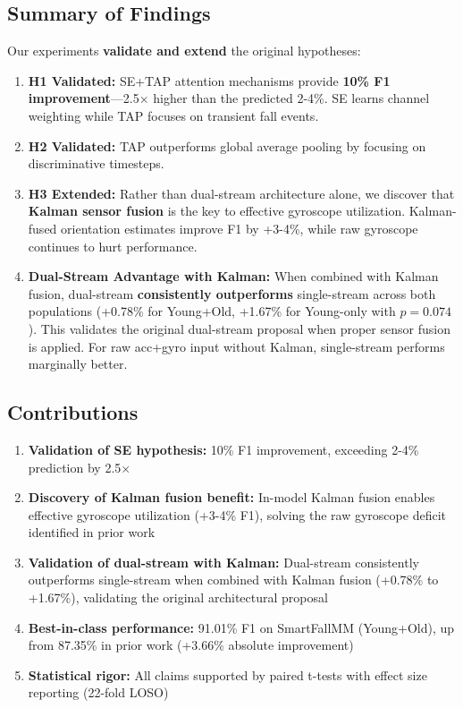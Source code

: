 \documentclass{article}
\begin{document}
\subsection{Summary of Findings}

Our experiments \textbf{validate and extend} the original hypotheses:

\begin{enumerate}
    \item \textbf{H1 Validated:} SE+TAP attention mechanisms provide \textbf{10\% F1 improvement}---2.5$\times$ higher than the predicted 2-4\%. SE learns channel weighting while TAP focuses on transient fall events.

    \item \textbf{H2 Validated:} TAP outperforms global average pooling by focusing on discriminative timesteps.

    \item \textbf{H3 Extended:} Rather than dual-stream architecture alone, we discover that \textbf{Kalman sensor fusion} is the key to effective gyroscope utilization. Kalman-fused orientation estimates improve F1 by +3-4\%, while raw gyroscope continues to hurt performance.

    \item \textbf{Dual-Stream Advantage with Kalman:} When combined with Kalman fusion, dual-stream \textbf{consistently outperforms} single-stream across both populations (+0.78\% for Young+Old, +1.67\% for Young-only with $p=0.074$). This validates the original dual-stream proposal when proper sensor fusion is applied. For raw acc+gyro input without Kalman, single-stream performs marginally better.
\end{enumerate}

\subsection{Contributions}

\begin{enumerate}
    \item \textbf{Validation of SE hypothesis:} 10\% F1 improvement, exceeding 2-4\% prediction by 2.5$\times$
    \item \textbf{Discovery of Kalman fusion benefit:} In-model Kalman fusion enables effective gyroscope utilization (+3-4\% F1), solving the raw gyroscope deficit identified in prior work
    \item \textbf{Validation of dual-stream with Kalman:} Dual-stream consistently outperforms single-stream when combined with Kalman fusion (+0.78\% to +1.67\%), validating the original architectural proposal
    \item \textbf{Best-in-class performance:} 91.01\% F1 on SmartFallMM (Young+Old), up from 87.35\% in prior work (+3.66\% absolute improvement)
    \item \textbf{Statistical rigor:} All claims supported by paired t-tests with effect size reporting (22-fold LOSO)
\end{enumerate}
\end{document}
